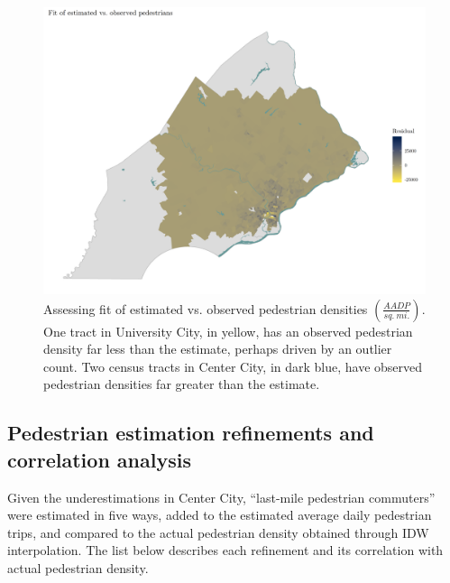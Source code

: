 \documentclass[paper=letterpaper, fontsize=11pt]{scrartcl}
\begin{document}
\FloatBarrier
\begin{figure}
	\centering
	\includegraphics[width = 9in]{resid.png}
	\caption{Assessing fit of estimated vs. observed pedestrian densities $\left(\frac{AADP}{sq.\:mi.}\right)$. One tract in University City, in yellow, has an observed pedestrian density far less than the estimate, perhaps driven by an outlier count. Two census tracts in Center City, in dark blue, have observed pedestrian densities far greater than the estimate.} \label{resid}
\end{figure}
\FloatBarrier

\subsection{Pedestrian estimation refinements and correlation analysis}

Given the underestimations in Center City, ``last-mile pedestrian commuters'' were estimated in five ways, added to the estimated average daily pedestrian trips, and compared to the actual pedestrian density obtained through IDW interpolation. The list below describes each refinement and its correlation with actual pedestrian density.
\end{document}
